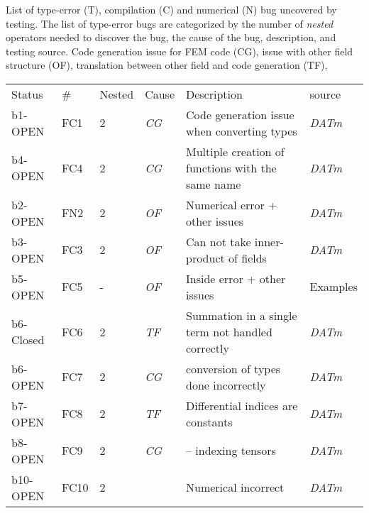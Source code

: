 \documentclass{article}
\newcommand{\fontit}[1]{\textit{#1}}
\newcommand{\checkname}[0]{\textit{DATm}}
\begin{document}
List of type-error (T), compilation (C) and numerical (N) bug uncovered by testing.
 The list of type-error bugs are categorized by the number of \fontit{nested} operators needed to discover the bug,  the cause of the bug, description, and testing source.
 Code generation issue for FEM code (CG), issue with other field structure (OF), translation between other field and code generation (TF),
\newline 
\begin{tabular}{|l|llll|l|}
\hline
Status & \# &Nested & Cause & Description & source\\
b1-OPEN &FC1 &2&\fontit{CG}&Code generation issue when converting types&\checkname{}\\
b4-OPEN &FC4 &2&\fontit{CG}&Multiple creation of functions with the same name &\checkname{}\\
b2-OPEN &FN2 &2&\fontit{OF}&Numerical error + other issues&\checkname{}\\
b3-OPEN &FC3 &2&\fontit{OF}& Can not take inner-product of fields&\checkname{} \\
b5-OPEN &FC5 &-&\fontit{OF}& Inside error + other issues& Examples\\
b6-Closed &FC6 &2&\fontit{TF} &  Summation in a single term not handled correctly & \checkname{}\\
b6-OPEN &FC7 &2& \fontit{CG}& conversion of types done incorrectly & \checkname{}\\
b7-OPEN &FC8 &2&  \fontit{TF}&Differential indices are constants& \checkname{}\\
b8-OPEN &FC9 &2&  \fontit{CG}&-- indexing tensors& \checkname{}\\
b10-OPEN &FC10 &2&  &Numerical incorrect& \checkname{}\\
\hline
\end{tabular}

\end{document}
